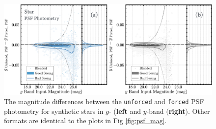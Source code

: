 \documentclass[useamsfonts]{pasj01}
\def\forced{\texttt{forced}}
\def\unforced{\texttt{unforced}}
\begin{document}
\begin{figure}
    \begin{center}
        \includegraphics[width=\textwidth]{fig/synpipe_psf_diff}
    \end{center}
    \caption{
        The magnitude differences between the \unforced{} and \forced{}
        PSF photometry for synthetic stars in $g$- (\textbf{left} and $y$-band 
        (\textbf{right}). 
        Other formats are identical to the plots in Fig \ref{fig:psf_mag}.
        }
    \label{fig:psf_diff}
\end{figure}
\end{document}
